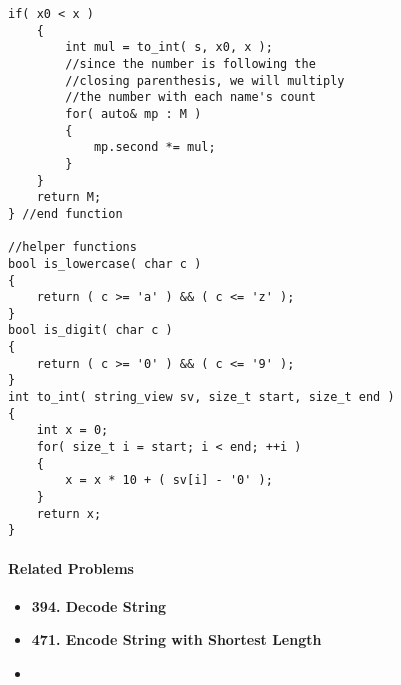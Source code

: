 \begin{lstlisting}[style=customc, caption={Recursion}]
    if( x0 < x )
    {
        int mul = to_int( s, x0, x );
        //since the number is following the
        //closing parenthesis, we will multiply
        //the number with each name's count
        for( auto& mp : M )
        {
            mp.second *= mul;
        }
    }
    return M;
} //end function

//helper functions
bool is_lowercase( char c )
{
    return ( c >= 'a' ) && ( c <= 'z' );
}
bool is_digit( char c )
{
    return ( c >= '0' ) && ( c <= '9' );
}
int to_int( string_view sv, size_t start, size_t end )
{
    int x = 0;
    for( size_t i = start; i < end; ++i )
    {
        x = x * 10 + ( sv[i] - '0' );
    }
    return x;
}
\end{lstlisting}

\paragraph{Related Problems}
\begin{itemize}
\item \textbf{394. Decode String}
\item \textbf{471. Encode String with Shortest Length}
\item 
\end{itemize}